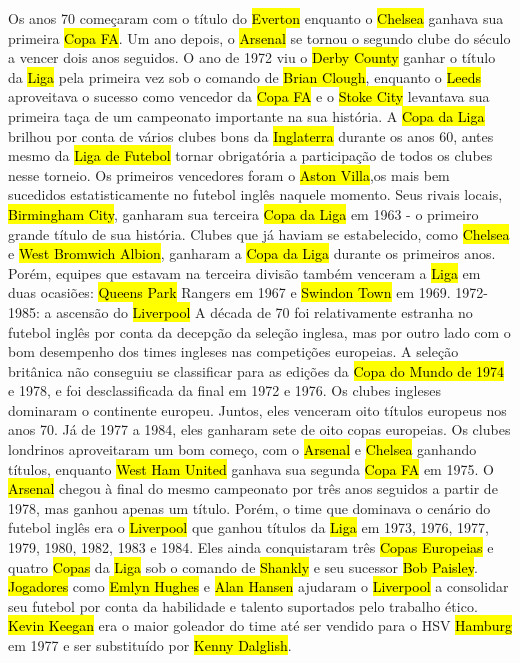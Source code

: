 \documentclass[a4paper,12pt]{article}
\begin{document}
Os anos 70 começaram com o título do \hl{Everton} enquanto o \hl{Chelsea} ganhava sua primeira \hl{Copa FA}. Um ano depois, o \hl{Arsenal} se tornou o segundo clube do século a vencer dois anos seguidos. O ano de 1972 viu o \hl{Derby County} ganhar o título da \hl{Liga} pela primeira vez sob o comando de \hl{Brian Clough}, enquanto o \hl{Leeds} aproveitava o sucesso como vencedor da \hl{Copa FA} e o \hl{Stoke City} levantava sua primeira taça de um campeonato importante na sua história.
A \hl{Copa da Liga} brilhou por conta de vários clubes bons da \hl{Inglaterra} durante os anos 60, antes mesmo da \hl{Liga de Futebol} tornar obrigatória a participação de todos os clubes nesse torneio. Os primeiros vencedores foram o \hl{Aston Villa},os mais bem sucedidos estatisticamente no futebol inglês naquele momento. Seus rivais locais, \hl{Birmingham City}, ganharam sua terceira \hl{Copa da Liga} em 1963 - o primeiro grande título de sua história. Clubes que já haviam se estabelecido, como \hl{Chelsea} e \hl{West Bromwich Albion}, ganharam a \hl{Copa da Liga} durante os primeiros anos. Porém, equipes que estavam na terceira divisão também venceram a \hl{Liga} em duas ocasiões: \hl{Queens Park} Rangers em 1967 e \hl{Swindon Town} em 1969.
1972-1985: a ascensão do \hl{Liverpool}
A década de 70 foi relativamente estranha no futebol inglês por conta da decepção da seleção inglesa, mas por outro lado com o bom desempenho dos times ingleses nas competições europeias. A seleção britânica não conseguiu se classificar para as edições da \hl{Copa do Mundo de 1974} e 1978, e foi desclassificada da final em 1972 e 1976. Os clubes ingleses dominaram o continente europeu. Juntos, eles venceram oito títulos europeus nos anos 70. Já de 1977 a 1984, eles ganharam sete de oito copas europeias.
Os clubes londrinos aproveitaram um bom começo, com o \hl{Arsenal} e \hl{Chelsea} ganhando títulos, enquanto \hl{West Ham United} ganhava sua segunda \hl{Copa FA} em 1975. O \hl{Arsenal} chegou à final do mesmo campeonato por três anos seguidos a partir de 1978, mas ganhou apenas um título.
Porém, o time que dominava o cenário do futebol inglês era o \hl{Liverpool} que ganhou títulos da \hl{Liga} em 1973, 1976, 1977, 1979, 1980, 1982, 1983 e 1984. Eles ainda conquistaram três \hl{Copas Europeias} e quatro \hl{Copas} da \hl{Liga} sob o comando de \hl{Shankly} e seu sucessor \hl{Bob Paisley}. \hl{Jogadores} como \hl{Emlyn Hughes} e \hl{Alan Hansen} ajudaram o \hl{Liverpool} a consolidar seu futebol por conta da habilidade e talento suportados pelo trabalho ético. \hl{Kevin Keegan} era o maior goleador do time até ser vendido para o HSV \hl{Hamburg} em 1977 e ser substituído por \hl{Kenny Dalglish}.
\end{document}

